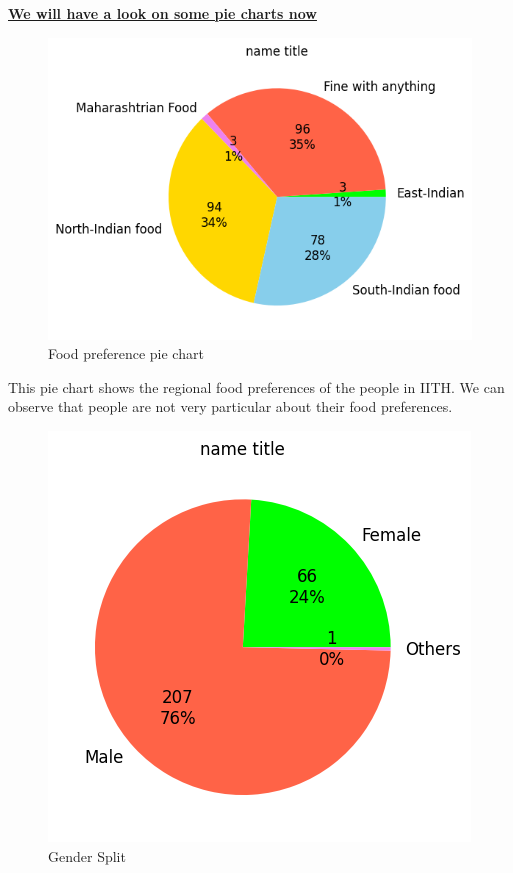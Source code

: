 \documentclass{article}
\begin{document}
\centerline{\underline{\bfseries{We will have a look on some pie charts now}}}
\begin{figure}[H]
    \centering
    \includegraphics[scale = 0.9]{pie_food_pref.png}
    \caption{Food preference pie chart}  
    \label{Normality_plot}
\end{figure}
This pie chart shows the regional food preferences of the people in IITH. We can observe that people are not very particular about their food preferences.
\begin{figure}[H]
    \centering
    \includegraphics[scale = 0.9]{pie_gender.png}
    \caption{Gender Split}  
    \label{Normality_plot}
\end{figure}
\end{document}
